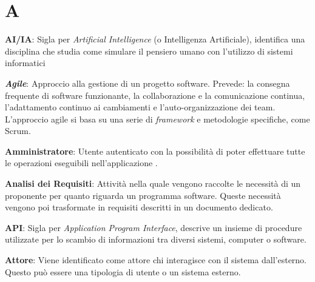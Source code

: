 \documentclass[5pt]{article}
\begin{document}
\section*{A}
\begin{flushleft}

\textbf{AI/IA}: Sigla per \textit{Artificial Intelligence} (o Intelligenza Artificiale), identifica una disciplina che studia come simulare il pensiero umano con l'utilizzo di sistemi informatici\newline

\textbf{\textit{Agile}}: Approccio alla gestione di un progetto software. Prevede: la consegna frequente di software funzionante, la collaborazione e la comunicazione continua, l'adattamento continuo ai cambiamenti e l'auto-organizzazione dei team. L'approccio agile si basa su una serie di \textit{framework} e metodologie specifiche, come Scrum.\newline

\textbf{Amministratore}: Utente autenticato con la possibilità di poter effettuare tutte le operazioni eseguibili nell'applicazione . \newline

\textbf{Analisi dei Requisiti}: Attività nella quale vengono raccolte le necessità di un proponente per quanto riguarda un programma software. Queste necessità vengono poi trasformate in requisiti descritti in un documento dedicato. \newline

\textbf{API}: Sigla per \textit{Application Program Interface}, descrive un insieme di procedure utilizzate per lo scambio di informazioni tra diversi sistemi, computer o software. \newline

\textbf{Attore}: Viene identificato come attore chi interagisce con il sistema dall'esterno. Questo può essere una tipologia di utente o un sistema esterno. 

\end{flushleft}

\pagebreak
\end{document}
